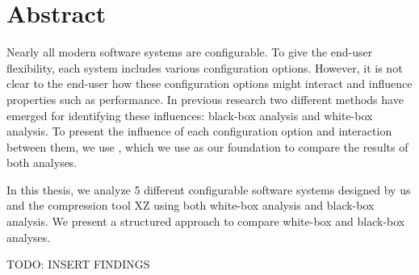 \begingroup
\let\clearpage\relax
\let\cleardoublepage\relax
\let\cleardoublepage\relax

\chapter*{Abstract}
Nearly all modern software systems are configurable. To give the end-user flexibility, each system includes various configuration options.
However, it is not clear to the end-user how these configuration options might interact and influence properties such as performance. 
In previous research two different methods have emerged for identifying these influences: black-box analysis and white-box analysis.
To present the influence of each configuration option and interaction between them, we use {\perfInfluenceModel}, which we use as our foundation
to compare the results of both analyses.

In this thesis, we analyze 5 different configurable software systems designed by us and the compression tool \textsc{XZ} using both white-box analysis
and black-box analysis. We present a structured approach to compare white-box and black-box analyses.

TODO: INSERT FINDINGS

\vfill

\endgroup

\vfill
